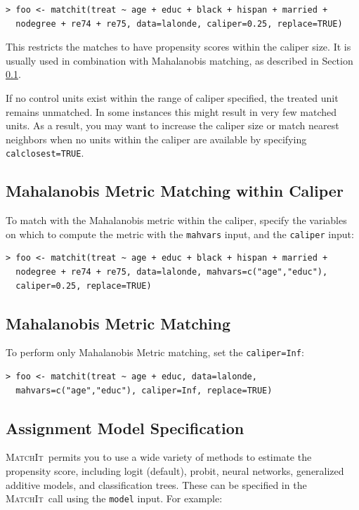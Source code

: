 \documentclass[oneside,letterpaper,titlepage]{article}
\newcommand{\MatchIt}{\textsc{MatchIt}}
\begin{document}
\begin{verbatim}
> foo <- matchit(treat ~ age + educ + black + hispan + married +
  nodegree + re74 + re75, data=lalonde, caliper=0.25, replace=TRUE)
\end{verbatim}

This restricts the matches to have propensity scores within the
caliper size.  It is usually used in combination with Mahalanobis
matching, as described in Section \ref{mahal}.

If no control units exist within the range of caliper specified, the
treated unit remains unmatched.  In some instances this might result
in very few matched units.  As a result, you may want to increase the
caliper size or match nearest neighbors when no units within the
caliper are available by specifying \texttt{calclosest=TRUE}.

\subsection{Mahalanobis Metric Matching within Caliper}
\label{mahal}
To match with the Mahalanobis metric within the caliper, specify the
variables on which to compute the metric with the \texttt{mahvars}
input, and the \texttt{caliper} input:

\begin{verbatim}
> foo <- matchit(treat ~ age + educ + black + hispan + married +
  nodegree + re74 + re75, data=lalonde, mahvars=c("age","educ"),
  caliper=0.25, replace=TRUE)
\end{verbatim}

\subsection{Mahalanobis Metric Matching}

To perform only Mahalanobis Metric matching, set the
\texttt{caliper=Inf}:

\begin{verbatim}
> foo <- matchit(treat ~ age + educ, data=lalonde,
  mahvars=c("age","educ"), caliper=Inf, replace=TRUE)
\end{verbatim}

\subsection{Assignment Model Specification}

\MatchIt\ permits you to use a wide variety of methods to
estimate the propensity score, including logit (default), probit,
neural networks, generalized additive models, and classification
trees.  These can be specified in the \MatchIt\ call using the
\texttt{model} input.  For example:
\end{document}

